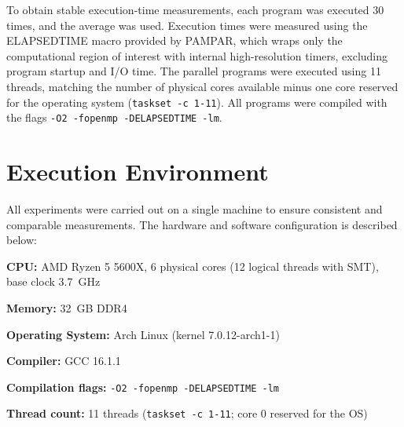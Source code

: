 To obtain stable execution-time measurements, each program was executed 30 times, and the average was used.
Execution times were measured using the ELAPSEDTIME macro provided by PAMPAR, which wraps only the computational region of interest with internal high-resolution timers, excluding program startup and I/O time.
The parallel programs were executed using 11 threads, matching the number of physical cores available minus one core reserved for the operating system (\texttt{taskset -c 1-11}).
All programs were compiled with the flags \texttt{-O2 -fopenmp -DELAPSEDTIME -lm}.

\section{Execution Environment}
\label{sec:environment}

All experiments were carried out on a single machine to ensure consistent and comparable measurements.
The hardware and software configuration is described below:

\begin{alineas}
\item \textbf{CPU:} AMD Ryzen 5 5600X, 6 physical cores (12 logical threads with SMT), base clock 3.7~GHz
\item \textbf{Memory:} 32~GB DDR4
\item \textbf{Operating System:} Arch Linux (kernel 7.0.12-arch1-1)
\item \textbf{Compiler:} GCC 16.1.1
\item \textbf{Compilation flags:} \texttt{-O2 -fopenmp -DELAPSEDTIME -lm}
\item \textbf{Thread count:} 11 threads (\texttt{taskset -c 1-11}; core 0 reserved for the OS)
\end{alineas}